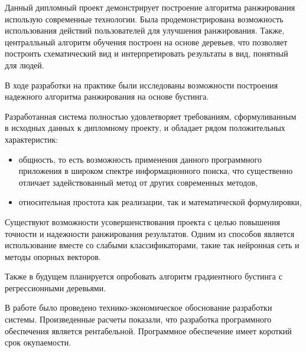 
Данный дипломный проект демонстрирует построение алгоритма ранжирования использую современные технологии. Была продемонстрирована возможность использования действий пользователей для улучшения ранжирования. Также, централльный алгоритм обучения построен на основе деревьев, что позволяет построить схематический вид и интерпретировать результаты в вид, понятный для людей.
 
В ходе разработки на практике были исследованы возможности построения надежного алгоритма ранжирования на основе бустинга.

Разработанная система полностью удовлетворяет требованиям, сформуливанным в исходных данных к дипломному проекту, и обладает рядом положительных характеристик:
\begin{itemize}
  \item общность, то есть возможность применения данного программного приложения в широком спектре информационного поиска, что существенно отличает задействованный метод от других современных методов,
  \item относительная простота как реализации, так и математической формулировки,
\end{itemize}

Существуют возможности усовершенствования проекта с целью повышения точности и надежности ранжирования результатов. Одним из способов является использование вместе со слабыми классификаторами, такие так нейронная сеть и методы опорных векторов.

Также в будущем планируется опробовать алгоритм градиентного бустинга с регрессионными деревьями. 

В работе было проведено технико-экономическое обоснование разработки системы. Произведенные расчеты показали, что разработка программного обеспечения является рентабельной. Программное обеспечение имеет короткий срок окупаемости.

\newpage
